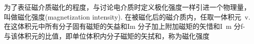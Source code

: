 
为了表征磁介质磁化的程度，与讨论电介质时定义极化强度一样引进一个物理量，叫做磁化强度(magnetization intensity). 在被磁化后的磁介质内，任取一体积元~v. 在这体积元中所有分子固有磁矩的矢益和Im 分子加上附加磁矩的矢惜和I~m 分f- 与该体积元的比值，即单位体积内分子磁矩的矢拭和，称为磁化强度  